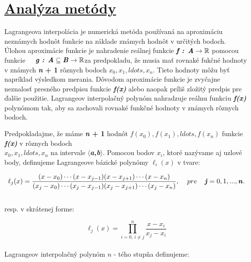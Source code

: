 \documentclass[12pt]{article}
\begin{document}
\section{\underline{Analýza metódy}}
\begin{justify}
    

    Lagrangeova interpolácia je numerická metóda používaná na aproximáciu neznámych hodnôt funkcie na základe známych hodnôt v určitých bodoch. Úlohou aproximácie funkcie je nahradenie reálnej funkcie\hspace{0.4cm} $\textbf{\textit{f : A}} \to \mathbb{R}$ \hspace{0.4cm}pomocou funkcie $ \hspace{0.4cm}\textbf{\textit{g : A}} \subseteq \textbf{\textit{B}} \to \mathbb{R}$\hspace{0.4cm}za predpokladu, že musia mať rovnaké fukčné hodnoty v známych \textbf{\textit{n} + 1} rôznych bodoch 
    \textbf{\textit{$x_0,x_1,ldots,x_n$}}. Tieto hodnoty môžu byť napríklad výsledkom merania. Dôvodom aproximácie funkcie je zvyčajne neznalosť presného predpisu funkcie \textbf{\textit{f(x)}} alebo naopak príliš zložitý predpis pre ďalšie použitie. Lagrangeov interpolačný polynóm nahradzuje reálnu funkciu \textbf{\textit{f(x)}} polynómom tak, aby sa zachovali rovnaké funkčné hodnoty v známych rôznych bodoch.  \\
\end{justify}
   
    
    
 \begin{justify}   
    Predpokladajme, že máme \textbf{\textit{n} + 1} hodnôt \textbf{\textit{$f(x_0),f(x_1),ldots,f(x_n)$}} 
    funkcie \textbf{\textit{f(x)}} v rôznych bodoch\\ \textbf{\textit{$x_0,x_1,ldots,x_n$}} na intervale $\langle$\textbf{\textit{a,b}}$\rangle$. Pomocou bodov \textbf{\textit{$x_i$}}, ktoré nazývame aj uzlové body, definujeme Lagrangeove bázické polynómy $\ell_i(x)$ v tvare:
\end{justify}
    
        \[\ell_j(x) = \frac{(x - x_0)\cdots(x - x_{j-1})(x - x_{j+1})\cdots(x - x_n)}{(x_j - x_0)\cdots(x_j - x_{j-1})(x_j - x_{j+1})\cdots(x_j - x_n)},\hspace{0.4cm} pre \hspace{0.4cm}\textbf{\textit{j}} = 0,1, ... ,\textbf{\textit{n}}.\] 
      \\
    resp. v skrátenej forme:

        \[\ell_j(x) = \prod _{i=0,\,i\neq j}^{n}\frac{x-x_i}{x_j-x_i}\]
    \\
    Lagrangeov interpolačný polynóm $n$ - tého stupňa definujeme:
\end{document}
